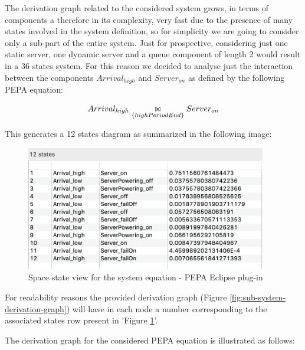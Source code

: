 \documentclass{article}
\newcommand{\newbowtie}{\mathrel{\ooalign{$\triangleright$\,\cr\,$\triangleleft$}}}
\begin{document}
\par\noindent The derivation graph related to the considered system grows, in terms of components a therefore in its complexity, very fast due to the presence of many states involved in the system definition, so for simplicity we are going to consider only a sub-part of the entire system. Just for prospective, considering just one static server, one dynamic server and a queue component of length 2 would result in a 36 states system. For this reason we decided to analyse just the interaction between the components \(Arrival_{high}\) and \(Server_{on}\) as defined by the following PEPA equation: 

\[Arrival_{high} \underset{\{highPeriodEnd\}}{\newbowtie} Server_{on} \]

\noindent This generates a 12 states diagram as summarized in the following image:

\begin{figure}[H]
    \centering
    \includegraphics[width=10.5cm]{space-state-view.png}
    \caption{Space state view for the system equation - PEPA Eclipse plug-in}
    \label{fig:space-state-view}
\end{figure}

\noindent For readability reasons the provided derivation graph (Figure \ref{fig:sub-system-derivation-graph}) will have in each node a number corresponding to the associated states row present in 'Figure \ref{fig:space-state-view}'.\newline

\par\noindent The derivation graph for the considered PEPA equation is illustrated as follows:
\end{document}
